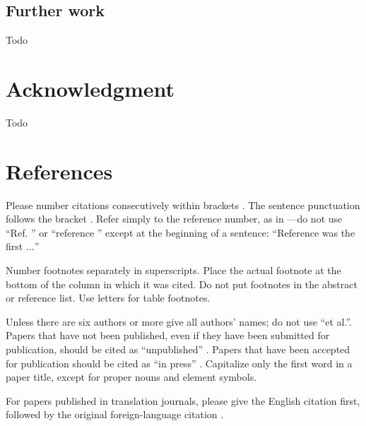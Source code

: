 \documentclass[conference]{IEEEtran}
\begin{document}
\subsection{Further work}
Todo


\section*{Acknowledgment}
Todo

\section*{References}

Please number citations consecutively within brackets \cite{b1}. The 
sentence punctuation follows the bracket \cite{b2}. Refer simply to the reference 
number, as in \cite{b3}---do not use ``Ref. \cite{b3}'' or ``reference \cite{b3}'' except at 
the beginning of a sentence: ``Reference \cite{b3} was the first $\ldots$''

Number footnotes separately in superscripts. Place the actual footnote at 
the bottom of the column in which it was cited. Do not put footnotes in the 
abstract or reference list. Use letters for table footnotes.

Unless there are six authors or more give all authors' names; do not use 
``et al.''. Papers that have not been published, even if they have been 
submitted for publication, should be cited as ``unpublished'' \cite{b4}. Papers 
that have been accepted for publication should be cited as ``in press'' \cite{b5}. 
Capitalize only the first word in a paper title, except for proper nouns and 
element symbols.

For papers published in translation journals, please give the English 
citation first, followed by the original foreign-language citation \cite{b6}.
\end{document}
